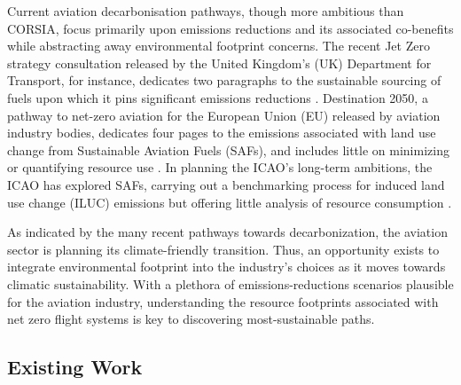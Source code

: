 \documentclass{article}
\begin{document}
Current aviation decarbonisation pathways, though more ambitious than CORSIA, focus primarily upon emissions reductions and its associated co-benefits while abstracting away environmental footprint concerns. The recent Jet Zero strategy consultation released by the United Kingdom’s (UK) Department for Transport, for instance, dedicates two paragraphs to the sustainable sourcing of fuels upon which it pins significant emissions reductions \citep[27]{department_for_transport_jet_2021}. Destination 2050, a pathway to net-zero aviation for the European Union (EU) released by aviation industry bodies, dedicates four pages to the emissions associated with land use change from Sustainable Aviation Fuels (SAFs), and includes little on minimizing or quantifying resource use \citep{nlr_-_royal_netherlands_aerospace_centre_destination_2021}. In planning the ICAO’s long-term ambitions, the ICAO has explored SAFs, carrying out a benchmarking process for induced land use change (ILUC) emissions but offering little analysis of resource consumption \citep{international_civil_aviation_organisation_icao_corsia_2019}.\par 
As indicated by the many recent pathways towards decarbonization, the aviation sector is planning its climate-friendly transition. Thus, an opportunity exists to integrate environmental footprint into the industry’s choices as it moves towards climatic sustainability. With a plethora of emissions-reductions scenarios plausible for the aviation industry, understanding the resource footprints associated with net zero flight systems is key to discovering most-sustainable paths. \par

\subsection*{Existing Work}
\end{document}
